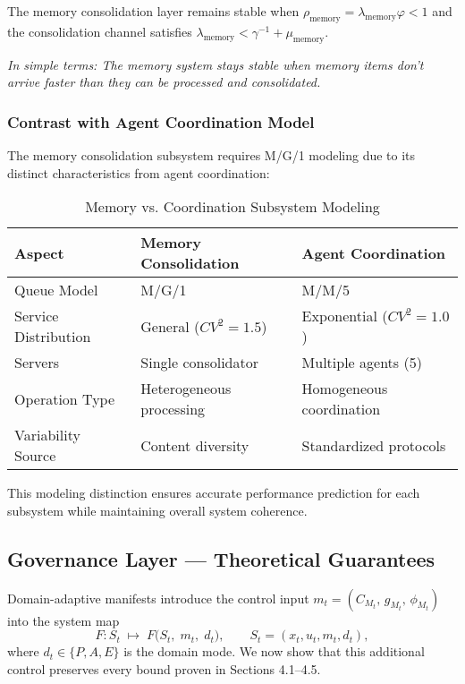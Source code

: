 \documentclass{article}
\begin{document}
\begin{definition}
The memory consolidation layer remains stable when $\rho_{\text{memory}} = \lambda_{\text{memory}}\varphi < 1$ and the consolidation channel satisfies $\lambda_{\text{memory}} < \gamma^{-1} + \mu_{\text{memory}}$.
\end{definition}
\textit{In simple terms: The memory system stays stable when memory items don't arrive faster than they can be processed and consolidated.}

\subsubsection{Contrast with Agent Coordination Model}

The memory consolidation subsystem requires M/G/1 modeling due to its distinct characteristics from agent coordination:

\begin{table}[h]
\centering
\caption{Memory vs. Coordination Subsystem Modeling}
\begin{tabular}{@{}lll@{}}
\toprule
Aspect & Memory Consolidation & Agent Coordination \\
\midrule
Queue Model & M/G/1 & M/M/5 \\
Service Distribution & General ($CV^2 = 1.5$) & Exponential ($CV^2 = 1.0$) \\
Servers & Single consolidator & Multiple agents (5) \\
Operation Type & Heterogeneous processing & Homogeneous coordination \\
Variability Source & Content diversity & Standardized protocols \\
\bottomrule
\end{tabular}
\end{table}

This modeling distinction ensures accurate performance prediction for each subsystem while maintaining overall system coherence.

\subsection{Governance Layer — Theoretical Guarantees}
\label{sec:gov-theory}

Domain-adaptive manifests introduce the control input
$m_t=(C_{M_t},\,g_{M_t},\,\phi_{M_t})$ into the system map
\[
F : S_t \;\mapsto\; F\!\bigl(S_t,\;m_t,\;d_t\bigr),
\qquad
S_t=(x_t,u_t,m_t,d_t),
\]
where $d_t\in\{P,A,E\}$ is the domain mode.
We now show that this additional control preserves every bound proven in
Sections 4.1–4.5.
\end{document}
